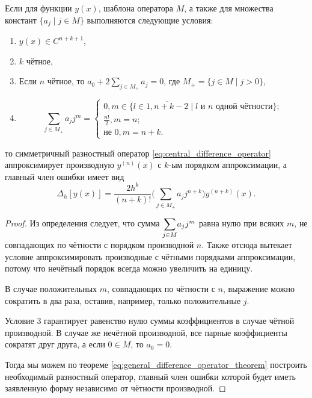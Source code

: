 \documentclass[../main.tex]{subfile}
\begin{document}
\begin{theorem}
	Если для функции $y(x)$, шаблона оператора $M$, а также для множества
	констант $\{a_j\mid j\in M\}$ выполняются следующие условия:
	\begin{enumerate}[noitemsep]
		\item $y(x)\in C^{n+k+1}$,
		\item $k$ чётное,
		\item Если $n$ чётное, то $a_0+2\sum_{j\in M_+}a_j=0$, где
			$M_+=\{j\in M\mid j>0\}$,
		\item	\begin{equation*}
				\sum_{j\in M_+}a_jj^m=
				\begin{cases}
					0, m\in \{l\in\overline{1,n+k-2}\mid l
						\text{ и }n\text{ одной
						чётности}\}; \\
					\frac{n!}{2}, m=n; \\
					\text{не } 0, m=n+k.
				\end{cases}
			\end{equation*}
	\end{enumerate}
	то симметричный разностный оператор
	\eqref{eq:central_difference_operator} аппроксимирует производную
	$y^{(n)}(x)$ с $k$-ым порядком аппроксимации, а главный член ошибки
	имеет вид
	\[\Delta_h[y(x)]=\frac{2h^k}{(n+k)!}\Big(\sum_{j\in M_+}a_jj^{n+k}\Big)
	y^{(n+k)}(x).\]
\end{theorem}

\begin{proof}
	Из определения следует, что сумма $\mathlarger\sum_{j\in M}a_jj^m$ равна
	нулю при всяких $m$, не совпадающих по чётности с порядком производной
	$n$. Также отсюда вытекает условие аппроксимировать производные с
	чётными порядками аппроксимации, потому что нечётный порядок всегда
	можно увеличить на единицу.

	В случае положительных $m$, совпадающих по чётности с $n$, выражение
	можно сократить в два раза, оставив, например, только положительные $j$.

	Условие 3 гарантирует равенство нулю суммы коэффициентов в случае чётной
	производной. В случае же нечётной производной, все парные коэффициенты
	сократят друг друга, а если $0\in M$, то $a_0=0$.
	
	Тогда мы можем  по теореме \eqref{eq:general_difference_operator_theorem}
	построить необходимый разностный оператор, главный член ошибки которой
	будет иметь заявленную форму независимо от чётности производной.
\end{proof}
\end{document}
